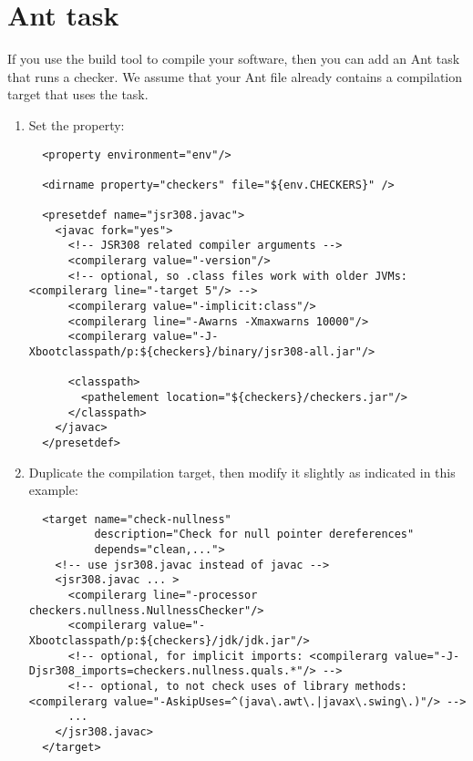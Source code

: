 \section{Ant task\label{ant-task}}

If you use the  build tool to compile
your software, then you can add an Ant task that runs a checker.  We assume
that your Ant file already contains a compilation target that uses the
 task.

\begin{enumerate}
\item
Set the  property:

\begin{smaller}
\begin{Verbatim}
  <property environment="env"/>

  <dirname property="checkers" file="${env.CHECKERS}" />

  <presetdef name="jsr308.javac">
    <javac fork="yes">
      <!-- JSR308 related compiler arguments -->
      <compilerarg value="-version"/>
      <!-- optional, so .class files work with older JVMs: <compilerarg line="-target 5"/> -->
      <compilerarg value="-implicit:class"/>
      <compilerarg line="-Awarns -Xmaxwarns 10000"/>
      <compilerarg value="-J-Xbootclasspath/p:${checkers}/binary/jsr308-all.jar"/>

      <classpath>
        <pathelement location="${checkers}/checkers.jar"/>
      </classpath>
    </javac>
  </presetdef>
\end{Verbatim}
\end{smaller}

\item Duplicate the compilation target, then modify it slightly as
indicated in this example:

\begin{smaller}
\begin{Verbatim}
  <target name="check-nullness"
          description="Check for null pointer dereferences"
          depends="clean,...">
    <!-- use jsr308.javac instead of javac -->
    <jsr308.javac ... >
      <compilerarg line="-processor checkers.nullness.NullnessChecker"/>
      <compilerarg value="-Xbootclasspath/p:${checkers}/jdk/jdk.jar"/>
      <!-- optional, for implicit imports: <compilerarg value="-J-Djsr308_imports=checkers.nullness.quals.*"/> -->
      <!-- optional, to not check uses of library methods: <compilerarg value="-AskipUses=^(java\.awt\.|javax\.swing\.)"/> -->
      ...
    </jsr308.javac>
  </target>
\end{Verbatim}
\end{smaller}


\end{enumerate}
